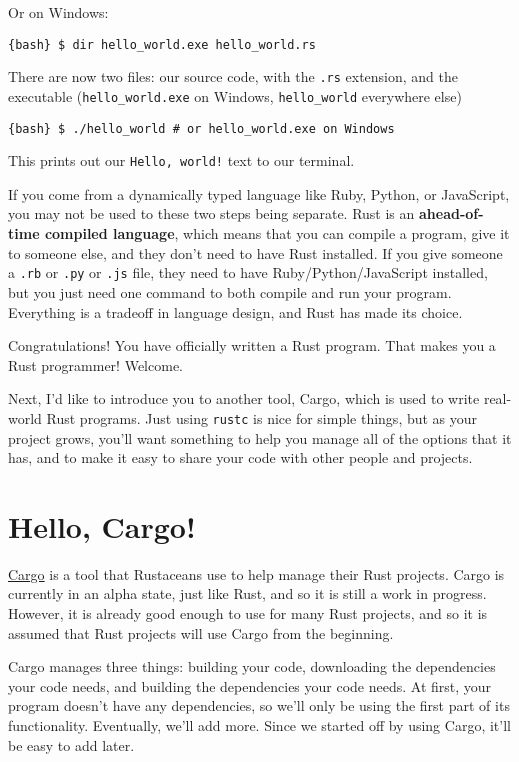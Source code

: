 \documentclass[]{article}
\begin{document}
Or on Windows:

\texttt{\{bash\} \$ dir hello\_world.exe  hello\_world.rs}

There are now two files: our source code, with the \texttt{.rs}
extension, and the executable (\texttt{hello\_world.exe} on Windows,
\texttt{hello\_world} everywhere else)

\texttt{\{bash\} \$ ./hello\_world  \# or hello\_world.exe on Windows}

This prints out our \texttt{Hello, world!} text to our terminal.

If you come from a dynamically typed language like Ruby, Python, or
JavaScript, you may not be used to these two steps being separate. Rust
is an \textbf{ahead-of-time compiled language}, which means that you can
compile a program, give it to someone else, and they don't need to have
Rust installed. If you give someone a \texttt{.rb} or \texttt{.py} or
\texttt{.js} file, they need to have Ruby/Python/JavaScript installed,
but you just need one command to both compile and run your program.
Everything is a tradeoff in language design, and Rust has made its
choice.

Congratulations! You have officially written a Rust program. That makes
you a Rust programmer! Welcome.

Next, I'd like to introduce you to another tool, Cargo, which is used to
write real-world Rust programs. Just using \texttt{rustc} is nice for
simple things, but as your project grows, you'll want something to help
you manage all of the options that it has, and to make it easy to share
your code with other people and projects.

\section{Hello, Cargo!}\label{hello-cargo}

\href{http://crates.io}{Cargo} is a tool that Rustaceans use to help
manage their Rust projects. Cargo is currently in an alpha state, just
like Rust, and so it is still a work in progress. However, it is already
good enough to use for many Rust projects, and so it is assumed that
Rust projects will use Cargo from the beginning.

Cargo manages three things: building your code, downloading the
dependencies your code needs, and building the dependencies your code
needs. At first, your program doesn't have any dependencies, so we'll
only be using the first part of its functionality. Eventually, we'll add
more. Since we started off by using Cargo, it'll be easy to add later.
\end{document}
